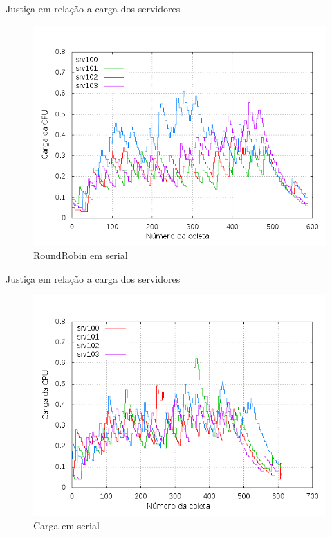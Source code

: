 \begin{frame}{Justiça em relação a carga dos servidores}

    \begin{figure}[htb!]
        \centering
        \includegraphics[scale=0.35]{images/balancer-serial-rr}
        \caption{RoundRobin em serial}
    \end{figure}

\end{frame}

\begin{frame}{Justiça em relação a carga dos servidores}

    \begin{figure}[htb!]
        \centering
        \includegraphics[scale=0.35]{images/balancer-serial-load}
        \caption{Carga em serial}
    \end{figure}

\end{frame}


